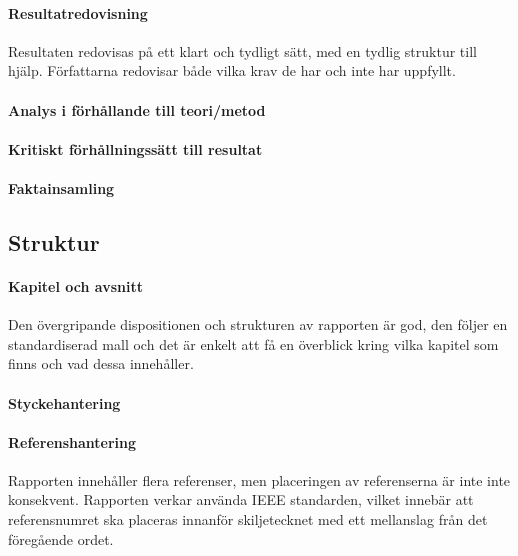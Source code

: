     \paragraph{Resultatredovisning}
        Resultaten redovisas på ett klart och tydligt sätt, med en tydlig struktur till hjälp. Författarna redovisar både vilka krav de har och inte har uppfyllt.

    \paragraph{Analys i förhållande till teori/metod  }
        

    \paragraph{Kritiskt förhållningssätt till resultat}

    \paragraph{Faktainsamling}


    \subsection{Struktur} %
    \label{sub:sturktur}
    \paragraph{Kapitel och avsnitt}
        Den övergripande dispositionen och strukturen av rapporten är god, den följer en standardiserad mall och det är enkelt att få en överblick kring vilka kapitel som finns och vad dessa innehåller. \bigskip
     
    \paragraph{Styckehantering}

    \paragraph{Referenshantering}
         Rapporten innehåller flera referenser, men placeringen av referenserna är inte inte konsekvent. Rapporten verkar använda IEEE standarden, vilket innebär att referensnumret ska placeras innanför skiljetecknet med ett mellanslag från det föregående ordet.
    

